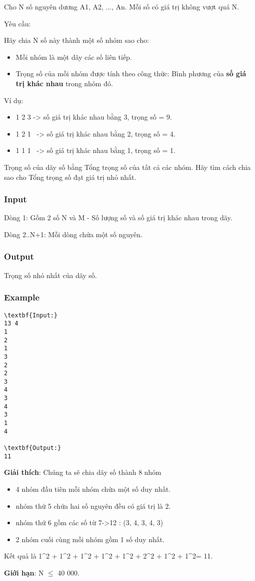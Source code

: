 

Cho N số nguyên dương A1, A2, ..., An. Mỗi số có giá trị không vượt quá N.

Yêu cầu:

Hãy chia N số này thành một số nhóm sao cho:
\begin{itemize}
	\item Mỗi nhóm là một dãy các số liên tiếp.
	\item Trọng số của mỗi nhóm được tính theo công thức: Bình phương của \textbf{số giá trị khác nhau} trong nhóm đó.
\end{itemize}

Ví dụ:
\begin{itemize}
	\item 1 2 3 -> số giá trị khác nhau bằng 3, trọng số = 9.
	\item 1 2 1  -> số giá trị khác nhau bằng 2, trọng số = 4.
	\item 1 1 1  -> số giá trị khác nhau bằng 1, trọng số = 1.
\end{itemize}

Trọng số của dãy số bằng Tổng trọng số của tất cả các nhóm. Hãy tìm cách chia sao cho Tổng trọng số đạt giá trị nhỏ nhất.

\subsubsection{Input}

Dòng 1: Gồm 2 số N và M - Số lượng số và số giá trị khác nhau trong dãy.

Dòng 2..N+1: Mỗi dòng chứa một số nguyên.

\subsubsection{Output}

Trọng số nhỏ nhất của dãy số.

\subsubsection{Example}
\begin{verbatim}
\textbf{Input:}
13 4
1
2
1
3
2
2
3
4
3
4
3
1
4

\textbf{Output:}
11\end{verbatim}







\textbf{Giải thích}: Chúng ta sẽ chia dãy số thành 8 nhóm
\begin{itemize}
	\item 4 nhóm đầu tiên mỗi nhóm chứa một số duy nhất.
	\item nhóm thứ 5 chứa hai số nguyên đều có giá trị là 2.
	\item nhóm thứ 6 gồm các số từ 7->12 : (3, 4, 3, 4, 3)
	\item 2 nhóm cuối cùng mỗi nhóm gồm 1 số duy nhất.
\end{itemize}




Kết quả là 1^2 + 1^2 + 1^2 + 1^2 + 1^2 + 2^2 + 1^2 + 1^2= 11.





\textbf{Giới hạn}: N  $\le$  40 000.
